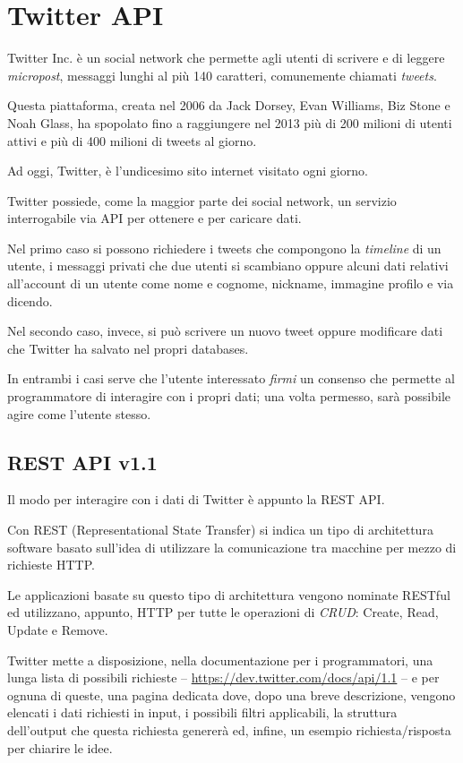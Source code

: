\section{Twitter API}
	Twitter Inc. è un social network che permette agli utenti di scrivere e di leggere \emph{micropost}, messaggi lunghi al più 140 caratteri, comunemente chiamati \emph{tweets}. 

	Questa piattaforma, creata nel 2006 da Jack Dorsey, Evan Williams, Biz Stone e Noah Glass, ha spopolato fino a raggiungere nel 2013 più di 200 milioni di utenti attivi e più di 400 milioni di tweets al giorno\cite{twitter_data}.

	Ad oggi, Twitter, è l'undicesimo sito internet visitato ogni giorno\cite{twitter_alexa}.

	Twitter possiede, come la maggior parte dei social network, un servizio interrogabile via API per ottenere e per caricare dati.

	Nel primo caso si possono richiedere i tweets che compongono la \emph{timeline} di un utente, i messaggi privati che due utenti si scambiano oppure alcuni dati relativi all'account di un utente come nome e cognome, nickname, immagine profilo e via dicendo.

	Nel secondo caso, invece, si può scrivere un nuovo tweet oppure modificare dati che Twitter ha salvato nel propri databases. 

	In entrambi i casi serve che l'utente interessato \emph{firmi} un consenso che permette al programmatore di interagire con i propri dati; una volta permesso, sarà possibile agire come l'utente stesso. 

	\subsection{REST API v1.1}
		Il modo per interagire con i dati di Twitter è appunto la REST API. 
	
		Con REST (Representational State Transfer) si indica un tipo di architettura software basato sull'idea di utilizzare la comunicazione tra macchine per mezzo di richieste HTTP.

		Le applicazioni basate su questo tipo di architettura vengono nominate RESTful ed utilizzano, appunto, HTTP per tutte le operazioni di \emph{CRUD}: Create, Read, Update e Remove.

		Twitter mette a disposizione, nella documentazione per i programmatori\cite{twitter_doc}, una lunga lista di possibili richieste -- \url{https://dev.twitter.com/docs/api/1.1} -- e per ognuna di queste, una pagina dedicata dove, dopo una breve descrizione, vengono elencati i dati richiesti in input, i possibili filtri applicabili, la struttura dell'output che questa richiesta genererà ed, infine, un esempio richiesta/risposta per chiarire le idee.


